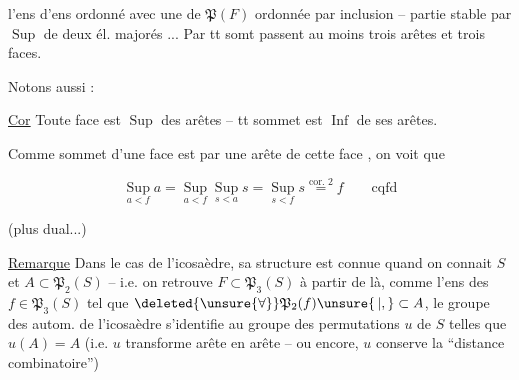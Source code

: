 
l'ens d'ens ordonné avec  une   de $\mathfrak P(F)$ ordonnée par inclusion -- partie stable par $\operatorname{Sup}$ de deux él. majorés ... Par tt somt passent au moins trois arêtes et trois faces.

Notons aussi :

\uline{Cor} Toute face est $\operatorname{Sup}$ des  arêtes -- tt sommet est $\operatorname{Inf}$ de ses arêtes.

Comme  sommet d'une face est  par une arête de cette face , on voit que

\[
 \operatorname*{Sup}_{a<f}a=\operatorname*{Sup}_{a<f}\operatorname*{Sup}_{s<a}s
 =\operatorname*{Sup}_{s<f}s\overset{\text{cor. 2}}{=}f\qquad\text{cqfd}
\]

(plus dual...)

\uline{Remarque} Dans le cas de l'icosaèdre, sa structure est connue quand on connait $S$ et $A\subset\mathfrak P_2(S)$ -- i.e. on retrouve $F\subset\mathfrak P_3(S)$ à partir de là, comme l'ens des $f\in\mathfrak P_3(S)$ tel que $\deleted{\unsure{\forall}}\mathfrak P_2(f)\unsure{\,|,}\subset A$,  le groupe des autom. de l'icosaèdre s'identifie au groupe des permutations $u$ de $S$ telles que $u(A)=A$ (i.e. $u$ transforme arête en arête -- ou encore, $u$ conserve la ``distance combinatoire'')



